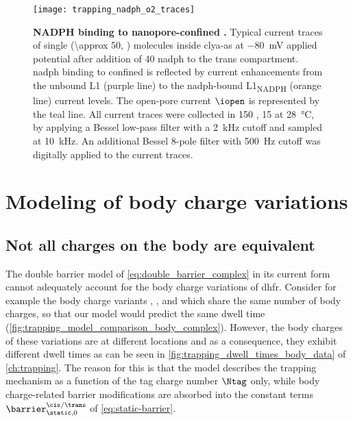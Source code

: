 %
\begin{figure*}[b]
  \centering
  \texttt{[image: trapping\_nadph\_o2\_traces]}
  \caption[{NADPH} binding to nanopore-confined .]{%
    \textbf{{NADPH} binding to nanopore-confined .}
    Typical current traces of single  (\SI{\approx 50}{\nM}, \cisi{}) molecules inside
    \gls{clya-as} at \SI{-80}{\mV} applied potential after addition of \SI{40}{\uM} \gls{nadph} to the trans
    compartment. \gls{nadph} binding to confined  is reflected by current enhancements from
    the unbound L1 (purple line) to the \gls{nadph}-bound L1\textsubscript{NADPH} (orange line) current
    levels. The open-pore current $\iopen$ is represented by the teal line. All current traces were collected
    in \SI{150}{\mM} , \SI{15}{\mM}   at \SI{28}{\celsius}, by applying a Bessel
    low-pass filter with a \SI{2}{\kilo\hertz} cutoff and sampled at \SI{10}{\kilo\hertz}. An additional
    Bessel 8-pole filter with \SI{500}{\hertz} cutoff was digitally applied to the current traces.
    }\label{fig:trapping_nadph_o2_traces}
\end{figure*}
%

%
\clearpage
%




\section{Modeling of body charge variations}
%
\label{sec:trapping_appendix:body_charge_variations}
%

\subsection{Not all charges on the body are equivalent}


The double barrier model of \cref{eq:double_barrier_complex} in its current form cannot adequately account for
the body charge variations of \gls{dhfr}\@. Consider for example the body charge variants ,
, and  which share the same number of body charges, so that our model would predict the
same dwell time (\cref{fig:trapping_model_comparison_body_complex}). However, the body charges of these
variations are at different locations and as a consequence, they exhibit different dwell times as can be seen
in \cref{fig:trapping_dwell_times_body_data} of \cref{ch:trapping}. The reason for this is that the model
describes the trapping mechanism as a function of the tag charge number $\Ntag$ only, while body charge-related
barrier modifications are absorbed into the constant terms $\barrier^{\cis/\trans}_{\static,0}$ of
\cref{eq:static-barrier}.


